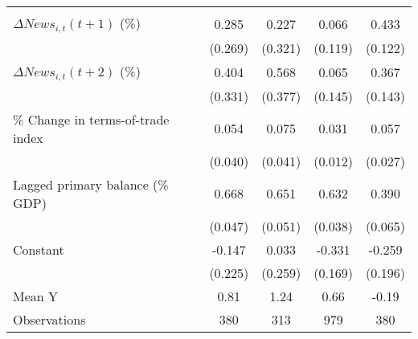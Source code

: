 {\begin{tabular}{l*{4}{c}}
                    &                     &                     &                     &                     \\
\addlinespace
$ \Delta News_{i,t}(t+1)$ (\%)&       0.285         &       0.227         &       0.066         &       0.433\sym{***}\\
                    &     (0.269)         &     (0.321)         &     (0.119)         &     (0.122)         \\
\addlinespace
$ \Delta News_{i,t}(t+2)$ (\%)&       0.404         &       0.568         &       0.065         &       0.367\sym{**} \\
                    &     (0.331)         &     (0.377)         &     (0.145)         &     (0.143)         \\
\addlinespace
\% Change in terms-of-trade index&       0.054         &       0.075\sym{*}  &       0.031\sym{**} &       0.057\sym{**} \\
                    &     (0.040)         &     (0.041)         &     (0.012)         &     (0.027)         \\
\addlinespace
Lagged primary balance (\% GDP)&       0.668\sym{***}&       0.651\sym{***}&       0.632\sym{***}&       0.390\sym{***}\\
                    &     (0.047)         &     (0.051)         &     (0.038)         &     (0.065)         \\
\addlinespace
Constant            &      -0.147         &       0.033         &      -0.331\sym{*}  &      -0.259         \\
                    &     (0.225)         &     (0.259)         &     (0.169)         &     (0.196)         \\
\midrule
Mean Y              &        0.81         &        1.24         &        0.66         &       -0.19         \\
Observations        &         380         &         313         &         979         &         380         \\
\bottomrule
\end{tabular}
}
